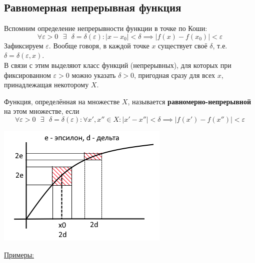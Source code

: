 \documentclass[12pt]{article}
\begin{document}
    \subsection{Равномерная непрерывная функция}\noindent
    Вспомним определение непрерывности функции в точке по Коши:
    \[ \forall \varepsilon > 0 \text{ } \exists \text{ } \delta = \delta(\varepsilon) : |x - x_0| < \delta \implies |f(x) - f(x_0)| < \varepsilon \]
    Зафиксируем $\varepsilon$. Вообще говоря, в каждой точке $x$ существует своё $\delta$, т.е. $\delta = \delta(\varepsilon, x)$.\\
    В связи с этим выделяют класс функций (непрерывных), для которых при фиксированном $\varepsilon > 0$ можно указать $\delta > 0$, пригодная сразу для всех $x$, принадлежащая некоторому $X$.\par\noindent
    Функция, определённая на множестве $X$, называется \textbf{равномерно-непрерывной} на этом множестве, если
    \[ \forall \varepsilon > 0 \text{ } \exists \text{ } \delta = \delta(\varepsilon) : \forall x', x'' \in X : |x' - x''| < \delta \implies |f(x') - f(x'')| < \varepsilon \]
    \begin{center}
        \includegraphics{3.9.1.png}
    \end{center}
    \underline{Примеры:}
\end{document}
